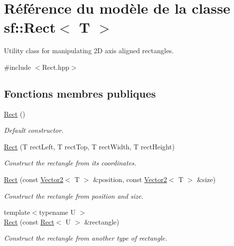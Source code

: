 \hypertarget{classsf_1_1Rect}{}\section{Référence du modèle de la classe sf\+:\+:Rect$<$ T $>$}
\label{classsf_1_1Rect}


Utility class for manipulating 2D axis aligned rectangles.  




{\ttfamily \#include $<$Rect.\+hpp$>$}

\subsection*{Fonctions membres publiques}
\begin{DoxyCompactItemize}
\item 
\hyperlink{classsf_1_1Rect_a0f87ebaef9722a6222fd2e04ce8efb37}{Rect} ()
\begin{DoxyCompactList}\small\item\em Default constructor. \end{DoxyCompactList}\item 
\hyperlink{classsf_1_1Rect_a15cdbc5a1aed3a8fc7be1bd5004f19f9}{Rect} (T rect\+Left, T rect\+Top, T rect\+Width, T rect\+Height)
\begin{DoxyCompactList}\small\item\em Construct the rectangle from its coordinates. \end{DoxyCompactList}\item 
\hyperlink{classsf_1_1Rect_a27fdf85caa6d12caeeff78913cc59936}{Rect} (const \hyperlink{classsf_1_1Vector2}{Vector2}$<$ T $>$ \&position, const \hyperlink{classsf_1_1Vector2}{Vector2}$<$ T $>$ \&size)
\begin{DoxyCompactList}\small\item\em Construct the rectangle from position and size. \end{DoxyCompactList}\item 
{\footnotesize template$<$typename U $>$ }\\\hyperlink{classsf_1_1Rect_a6fff2bb7e93677839461a66bc2957de0}{Rect} (const \hyperlink{classsf_1_1Rect}{Rect}$<$ U $>$ \&rectangle)
\begin{DoxyCompactList}\small\item\em Construct the rectangle from another type of rectangle. \end{DoxyCompactList}\item 

\end{DoxyCompactItemize}
